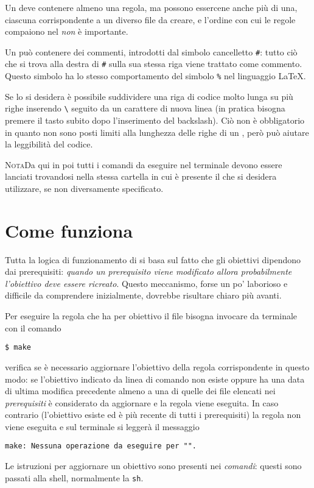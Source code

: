 Un  deve contenere almeno una regola, ma possono essercene
anche più di una, ciascuna corrispondente a un diverso file da creare, e
l'ordine con cui le regole compaiono nel  \emph{non} è
importante.

Un  può contenere dei commenti, introdotti dal simbolo
cancelletto \texttt{\#}: tutto ciò che si trova alla destra di \texttt{\#} sulla
sua stessa riga viene trattato come commento.  Questo simbolo ha lo stesso
comportamento del simbolo \texttt{\%} nel linguaggio \LaTeX{}.

Se lo si desidera è possibile suddividere una riga di codice molto lunga su più
righe inserendo \texttt{\textbackslash{}} seguito da un carattere di nuova linea
(in pratica bisogna premere il tasto  subito dopo l'inserimento del
backslash).  Ciò non è obbligatorio in quanto non sono posti limiti alla
lunghezza delle righe di un , però può aiutare la
leggibilità del codice.

\textsc{Nota}\quad Da qui in poi tutti i comandi da eseguire nel terminale
devono essere lanciati trovandosi nella stessa cartella in cui è presente il
 che si desidera utilizzare, se non diversamente
specificato.

\section{Come funziona }
\label{sec:come-funziona}

Tutta la logica di funzionamento di  si basa sul fatto che gli
obiettivi dipendono dai prerequisiti:
\emph{quando un prerequisito viene modificato allora probabilmente l'obiettivo
  deve essere ricreato}.
Questo meccanismo, forse un po' laborioso e difficile da comprendere
inizialmente, dovrebbe risultare chiaro più avanti.

Per eseguire la regola che ha per obiettivo il file  bisogna
invocare  da terminale con il comando
\begin{sintassi}
  \small \texttt{\$ make} 
\end{sintassi}
 verifica se è necessario aggiornare l'obiettivo della regola
corrispondente in questo modo: se l'obiettivo indicato da linea di comando non
esiste oppure ha una data di ultima modifica precedente almeno a una di quelle
dei file elencati nei \emph{prerequisiti} è considerato da aggiornare e la
regola viene eseguita.  In caso contrario (l'obiettivo esiste ed è più recente
di tutti i prerequisiti) la regola non viene eseguita e sul terminale si leggerà
il messaggio
\begin{flushleft}
  \texttt{make: Nessuna operazione da eseguire per "}\texttt{".}
\end{flushleft}
Le istruzioni per aggiornare un obiettivo sono presenti nei \emph{comandi}:
questi sono passati alla shell, normalmente la \texttt{sh}.

